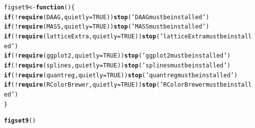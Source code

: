 \documentclass[12pt, a4paper,  BCOR=8.25mm, DIV=15]{scrartcl}\usepackage[]{graphicx}\usepackage[]{color}
\makeatletter
\newcommand{\hlnum}[1]{\textcolor[rgb]{0.686,0.059,0.569}{#1}}%
\newcommand{\hlstr}[1]{\textcolor[rgb]{0.192,0.494,0.8}{#1}}%
\newcommand{\hlopt}[1]{\textcolor[rgb]{0,0,0}{#1}}%
\newcommand{\hlstd}[1]{\textcolor[rgb]{0.345,0.345,0.345}{#1}}%
\newcommand{\hlkwa}[1]{\textcolor[rgb]{0.161,0.373,0.58}{\textbf{#1}}}%
\newcommand{\hlkwb}[1]{\textcolor[rgb]{0.69,0.353,0.396}{#1}}%
\newcommand{\hlkwc}[1]{\textcolor[rgb]{0.333,0.667,0.333}{#1}}%
\newcommand{\hlkwd}[1]{\textcolor[rgb]{0.737,0.353,0.396}{\textbf{#1}}}%
\newenvironment{kframe}{%
 \def\at@end@of@kframe{}%
 \ifinner\ifhmode%
  \def\at@end@of@kframe{\end{minipage}}%
  \begin{minipage}{\columnwidth}%
 \fi\fi%
 \def\FrameCommand##1{\hskip\@totalleftmargin \hskip-\fboxsep
 \colorbox{shadecolor}{##1}\hskip-\fboxsep
     \hskip-\linewidth \hskip-\@totalleftmargin \hskip\columnwidth}%
 \MakeFramed {\advance\hsize-\width
   \@totalleftmargin\z@ \linewidth\hsize
   \@setminipage}}%
 {\par\unskip\endMakeFramed%
 \at@end@of@kframe}
\newenvironment{knitrout}{}{} %
\makeatother
\begin{document}
\begin{knitrout}
\color{fgcolor}\begin{kframe}
\begin{alltt}
\hlstd{figset9} \hlkwb{<-} \hlkwa{function}\hlstd{()\{}
  \hlkwa{if}\hlstd{(}\hlopt{!}\hlkwd{require}\hlstd{(DAAG,} \hlkwc{quietly}\hlstd{=}\hlnum{TRUE}\hlstd{))}\hlkwd{stop}\hlstd{(}\hlstr{'DAAG must be installed'}\hlstd{)}
  \hlkwa{if}\hlstd{(}\hlopt{!}\hlkwd{require}\hlstd{(MASS,} \hlkwc{quietly}\hlstd{=}\hlnum{TRUE}\hlstd{))}\hlkwd{stop}\hlstd{(}\hlstr{'MASS must be installed'}\hlstd{)}
  \hlkwa{if}\hlstd{(}\hlopt{!}\hlkwd{require}\hlstd{(latticeExtra,} \hlkwc{quietly}\hlstd{=}\hlnum{TRUE}\hlstd{))}\hlkwd{stop}\hlstd{(}\hlstr{'latticeExtra must be installed'}\hlstd{)}
  \hlkwa{if}\hlstd{(}\hlopt{!}\hlkwd{require}\hlstd{(ggplot2,} \hlkwc{quietly}\hlstd{=}\hlnum{TRUE}\hlstd{))}\hlkwd{stop}\hlstd{(}\hlstr{'ggplot2 must be installed'}\hlstd{)}
  \hlkwa{if}\hlstd{(}\hlopt{!}\hlkwd{require}\hlstd{(splines,} \hlkwc{quietly}\hlstd{=}\hlnum{TRUE}\hlstd{))}\hlkwd{stop}\hlstd{(}\hlstr{'splines must be installed'}\hlstd{)}
  \hlkwa{if}\hlstd{(}\hlopt{!}\hlkwd{require}\hlstd{(quantreg,} \hlkwc{quietly}\hlstd{=}\hlnum{TRUE}\hlstd{))}\hlkwd{stop}\hlstd{(}\hlstr{'quantreg must be installed'}\hlstd{)}
  \hlkwa{if}\hlstd{(}\hlopt{!}\hlkwd{require}\hlstd{(RColorBrewer,} \hlkwc{quietly}\hlstd{=}\hlnum{TRUE}\hlstd{))}\hlkwd{stop}\hlstd{(}\hlstr{'RColorBrewer must be installed'}\hlstd{)}
  \hlstd{\}}
\end{alltt}
\end{kframe}
\end{knitrout}

\begin{knitrout}
\color{fgcolor}\begin{kframe}
\begin{alltt}
\hlkwd{figset9}\hlstd{()}
\end{alltt}


{\ttfamily\noindent\itshape\color{messagecolor}{\\Attaching package: 'MASS'}}

{\ttfamily\noindent\itshape\color{messagecolor}{The following object is masked from 'package:DAAG':

\ \ \ \ hills}}

{\ttfamily\noindent\itshape\color{messagecolor}{\\Attaching package: 'ggplot2'}}

{\ttfamily\noindent\itshape\color{messagecolor}{The following object is masked from 'package:latticeExtra':

\ \ \ \ layer}}

{\ttfamily\noindent\itshape\color{messagecolor}{\\Attaching package: 'SparseM'}}

{\ttfamily\noindent\itshape\color{messagecolor}{The following object is masked from 'package:base':

\ \ \ \ backsolve}}\end{kframe}
\end{knitrout}
\end{document}

